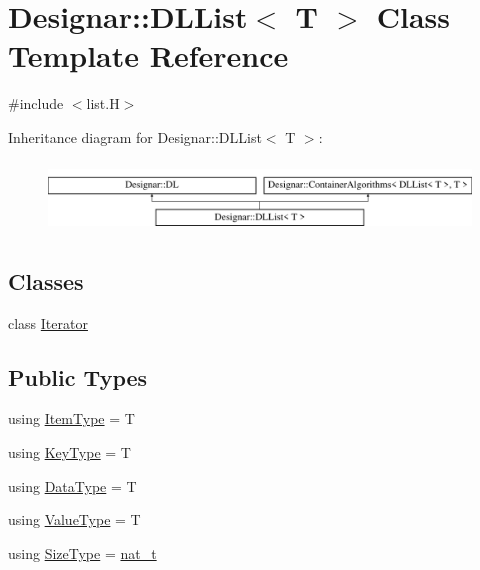 \hypertarget{class_designar_1_1_d_l_list}{}\section{Designar\+:\+:D\+L\+List$<$ T $>$ Class Template Reference}
\label{class_designar_1_1_d_l_list}


{\ttfamily \#include $<$list.\+H$>$}

Inheritance diagram for Designar\+:\+:D\+L\+List$<$ T $>$\+:\begin{figure}[H]
\begin{center}
\leavevmode
\includegraphics[height=1.885522cm]{class_designar_1_1_d_l_list}
\end{center}
\end{figure}
\subsection*{Classes}
\begin{DoxyCompactItemize}
\item 
class \hyperlink{class_designar_1_1_d_l_list_1_1_iterator}{Iterator}
\end{DoxyCompactItemize}
\subsection*{Public Types}
\begin{DoxyCompactItemize}
\item 
using \hyperlink{class_designar_1_1_d_l_list_a622fc13673b169c75309314ae2ebc005}{Item\+Type} = T
\item 
using \hyperlink{class_designar_1_1_d_l_list_ac27702ab24c52fa9d770abc3c455bb25}{Key\+Type} = T
\item 
using \hyperlink{class_designar_1_1_d_l_list_ac2f57201101389ca63aec1c2fba61038}{Data\+Type} = T
\item 
using \hyperlink{class_designar_1_1_d_l_list_a839e4da136d61d24ba8f14fb4d9ceb34}{Value\+Type} = T
\item 
using \hyperlink{class_designar_1_1_d_l_list_ac03520f15d4db4a31f8764ed5633e0c6}{Size\+Type} = \hyperlink{namespace_designar_aa72662848b9f4815e7bf31a7cf3e33d1}{nat\+\_\+t}
\end{DoxyCompactItemize}
